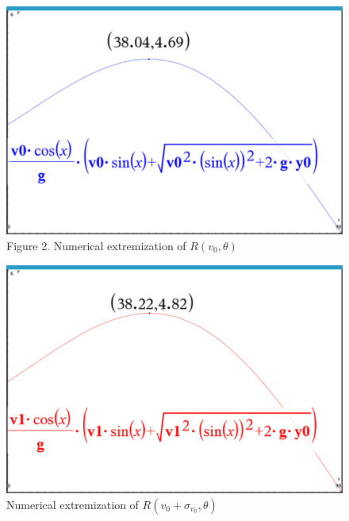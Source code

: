 \documentclass[12pt]{article}
\begin{document}
        \begin{figure}[h]
            \caption{Figure 2. Numerical extremization of $R(v_0, \theta)$}
            \includegraphics[width=\linewidth]{Figure 1.png}
        \end{figure}
        \begin{figure}[H]
            \caption{Numerical extremization of $R(v_0 + \sigma_{v_0}, \theta)$}
            \includegraphics[width=\linewidth]{Figure 2.png}
        \end{figure}
\end{document}
